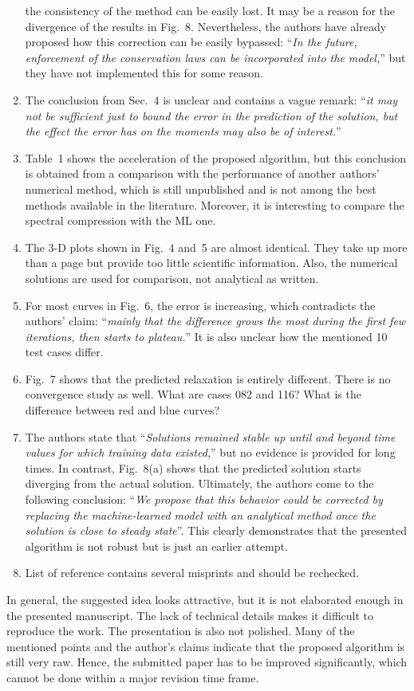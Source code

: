 \documentclass[11pt]{article}
\newcommand{\claim}[1]{``\emph{#1}''}
\begin{document}
\begin{enumerate}
    the consistency of the method can be easily lost. It may be a reason for the divergence of the results in Fig.~8.
    Nevertheless, the authors have already proposed how this correction can be easily bypassed:
    \claim{In the future, enforcement of the conservation laws can be incorporated into the model,}
    but they have not implemented this for some reason.
    \item The conclusion from Sec.~4 is unclear and contains a vague remark:
    \claim{it may not be sufficient just to bound the error in the prediction of the solution,
    but the effect the error has on the moments may also be of interest.}
    \item Table~1 shows the acceleration of the proposed algorithm, but this conclusion is obtained from a comparison
    with the performance of another authors' numerical method,
    which is still unpublished and is not among the best methods available in the literature.
    Moreover, it is interesting to compare the spectral compression with the ML one.
    \item The 3-D plots shown in Fig.~4 and~5 are almost identical. They take up more than a page
    but provide too little scientific information.
    Also, the numerical solutions are used for comparison, not analytical as written.
    \item For most curves in Fig.~6, the error is increasing, which contradicts the authors' claim:
    \claim{mainly that the difference grows the most during the first few iterations, then starts to plateau.}
    It is also unclear how the mentioned 10 test cases differ.
    \item Fig.~7 shows that the predicted relaxation is entirely different. There is no convergence study as well.
    What are cases 082 and 116? What is the difference between red and blue curves?
    \item The authors state that \claim{Solutions remained stable up until and beyond time values
    for which training data existed,} but no evidence is provided for long times.
    In contrast, Fig.~8(a) shows that the predicted solution starts diverging from the actual solution.
    Ultimately, the authors come to the following conclusion:
    \claim{We propose that this behavior could be corrected by replacing the machine-learned model
    with an analytical method once the solution is close to steady state}.
    This clearly demonstrates that the presented algorithm is not robust but is just an earlier attempt.
    \item List of reference contains several misprints and should be rechecked.
\end{enumerate}

In general, the suggested idea looks attractive, but it is not elaborated enough in the presented manuscript.
The lack of technical details makes it difficult to reproduce the work.
The presentation is also not polished.
Many of the mentioned points and the author's claims indicate that the proposed algorithm is still very raw.
Hence, the submitted paper has to be improved significantly,
which cannot be done within a major revision time frame.

\printbibliography
\end{document}
